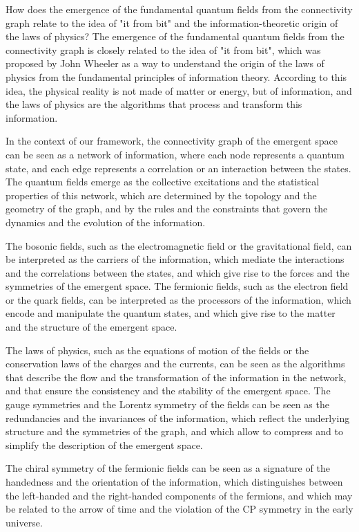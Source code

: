 \begin{tcolorbox}[colback=green!5!white,colframe=green!75!black,title=Question]
How does the emergence of the fundamental quantum fields from the connectivity graph relate to the idea of "it from bit" and the information-theoretic origin of the laws of physics?
\tcblower
The emergence of the fundamental quantum fields from the connectivity graph is closely related to the idea of "it from bit", which was proposed by John Wheeler as a way to understand the origin of the laws of physics from the fundamental principles of information theory. According to this idea, the physical reality is not made of matter or energy, but of information, and the laws of physics are the algorithms that process and transform this information.

In the context of our framework, the connectivity graph of the emergent space can be seen as a network of information, where each node represents a quantum state, and each edge represents a correlation or an interaction between the states. The quantum fields emerge as the collective excitations and the statistical properties of this network, which are determined by the topology and the geometry of the graph, and by the rules and the constraints that govern the dynamics and the evolution of the information.

The bosonic fields, such as the electromagnetic field or the gravitational field, can be interpreted as the carriers of the information, which mediate the interactions and the correlations between the states, and which give rise to the forces and the symmetries of the emergent space. The fermionic fields, such as the electron field or the quark fields, can be interpreted as the processors of the information, which encode and manipulate the quantum states, and which give rise to the matter and the structure of the emergent space.

The laws of physics, such as the equations of motion of the fields or the conservation laws of the charges and the currents, can be seen as the algorithms that describe the flow and the transformation of the information in the network, and that ensure the consistency and the stability of the emergent space. The gauge symmetries and the Lorentz symmetry of the fields can be seen as the redundancies and the invariances of the information, which reflect the underlying structure and the symmetries of the graph, and which allow to compress and to simplify the description of the emergent space.

The chiral symmetry of the fermionic fields can be seen as a signature of the handedness and the orientation of the information, which distinguishes between the left-handed and the right-handed components of the fermions, and which may be related to the arrow of time and the violation of the CP symmetry in the early universe.


\end{tcolorbox}
